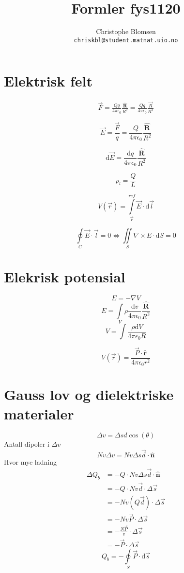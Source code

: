 \documentclass[a4paper,10pt,english]{article}
\title{Formler fys1120}
\author{
		Christophe Blomsen\\
		\texttt{\href{mailto:chriskbl@student.matnat.uio.no}{chriskbl@student.matnat.uio.no}}
		}
\newcommand{\dd}[1]{\mathrm{d}#1}
\newcommand{\uvec}[1]{\boldsymbol{\hat{\textbf{#1}}}}
\begin{document}
	\begin{titlepage}
	\maketitle
	\tableofcontents
	\end{titlepage}


\section{Elektrisk felt}

\begin{align*}
	\vec{F} = \frac{Qq}{4 \pi \epsilon_0}	\frac{ \uvec{R}}{R^2} = \frac{ Qq}{4 \pi \epsilon_0} \frac{ \vec{R}}{R^3}
\end{align*}

\[
	\vec{E}= \frac{ \vec{F}}{q} = \frac{Q}{4 \pi \epsilon_0} \frac{\uvec{R}}{R^2}
\] 

\[
	\dd{ \vec{E}} = \frac{ \dd{ q} }{4 \pi \epsilon_0} \frac{ \uvec{R}}{R^2}
\] 

\[
\rho_l = \frac{ Q}{L}
\] 

\[
	V(\vec{r}) = \int \limits_{\vec{r}}^{ref} \vec{E} \cdot \dd{ \vec{l}} 
\] 

\[
	\oint \limits_C \vec{E} \cdot \vec{l} = 0 \Leftrightarrow \iint \limits_S \nabla \times E \cdot \dd{ S} =0
\] 
\section{Elekrisk potensial}

\[
	E = - \nabla V
\] 
\[
	E = \int \limits_V \rho \frac{ \dd{ v} }{4 \pi \epsilon_0} \frac{ \uvec{R}}{R^2}
\] 
\[
	V = \int \frac{\rho \dd{ V} }{4 \pi \epsilon_0 R}
\] 

\[
	V(\vec{r}) = \frac{ \vec{P} \cdot \uvec{r}}{4 \pi \epsilon_0 r^2}
\] 
\section{Gauss lov og dielektriske materialer}
\[
\Delta v = \Delta s d \cos( \theta) 
\] 
Antall dipoler i $\Delta v$
 \[
	 Nv \Delta v = Nv \Delta s \vec{d} \cdot \uvec{n}
\] 
Hvor mye ladning
\begin{align*}
	\Delta Q_b &= -Q \cdot Nv \Delta s \vec{d} \cdot \uvec{n}\\
		   &= -Q \cdot Nv \vec{d} \cdot \Delta \vec{s} \\
		   &= -Nv \left( Q \vec{d} \right) \cdot \Delta \vec{s}\\
		   &= - Nv \vec{P} \cdot \Delta \vec{s}\\
		   &= - \frac{ N \vec{P}}{v} \cdot \Delta \vec{s} \\
		   &= - \vec{P} \cdot \Delta \vec{s}
\end{align*} 
\[
	Q_b = - \oint \limits_S \vec{P} \cdot \dd{ \vec{s}} 
\] 
\end{document}
